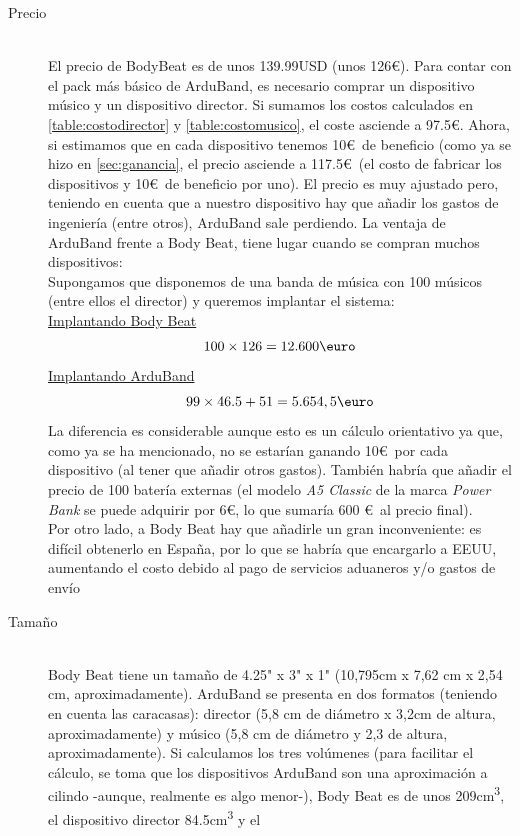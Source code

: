 \begin{description}
  \item[Precio] \hfill \\
    El precio de BodyBeat es de unos 139.99USD (unos 126\euro). Para contar con el pack más básico de ArduBand, es
    necesario comprar un dispositivo músico y un dispositivo director. Si sumamos los costos
    calculados en \ref{table:costodirector} y \ref{table:costomusico}, el coste asciende a 97.5\euro.
    Ahora, si estimamos que en cada dispositivo tenemos 10\euro\ de beneficio (como ya se hizo en \ref{sec:ganancia},
    el precio asciende a 117.5\euro\ (el costo de fabricar los dispositivos y 10\euro\ de beneficio por uno). El precio
    es muy ajustado pero, teniendo en cuenta que a nuestro dispositivo hay que añadir los gastos de ingeniería (entre otros),
    ArduBand sale perdiendo. La ventaja de ArduBand frente a Body Beat, tiene lugar cuando
    se compran muchos dispositivos:\\
    Supongamos que disponemos de una banda de música con 100 músicos (entre ellos el director)
    y queremos implantar el sistema:\\
    \underline{Implantando Body Beat}
    \[
      100 \times 126 = 12.600 \textup{\euro}
    \]
    \underline{Implantando ArduBand}
    \[
      99 \times 46.5 + 51 = 5.654,5 \textup{\euro}
    \]
    La diferencia es considerable aunque esto es un cálculo orientativo ya que, como ya se ha mencionado,
    no se estarían ganando 10\euro\ por cada dispositivo (al tener que añadir otros gastos). También
    habría que añadir el precio de 100 batería externas (el modelo \textit{A5 Classic} de la marca \textit{Power Bank} se puede
    adquirir por 6\euro, lo que sumaría 600 \euro\ al precio final).\\
    Por otro lado, a Body Beat hay que añadirle un gran inconveniente: es difícil
    obtenerlo en España, por lo que se habría que encargarlo a EEUU, aumentando el costo
    debido al pago de servicios aduaneros y/o gastos de envío
  \item[Tamaño] \hfill \\
    Body Beat tiene un tamaño de 4.25" x 3" x 1" (10,795cm x 7,62 cm x 2,54 cm, aproximadamente).
    ArduBand se presenta en dos formatos (teniendo en cuenta las caracasas): director (5,8 cm de diámetro x 3,2cm de altura,
    aproximadamente) y músico (5,8 cm de diámetro y 2,3 de altura, aproximadamente). Si calculamos los tres volúmenes (para facilitar
    el cálculo, se toma que los dispositivos ArduBand son una aproximación a cilindo -aunque, realmente es algo menor-),
    Body Beat es de unos 209cm\textsuperscript{3}, el dispositivo director 84.5cm\textsuperscript{3} y el

\end{description}
